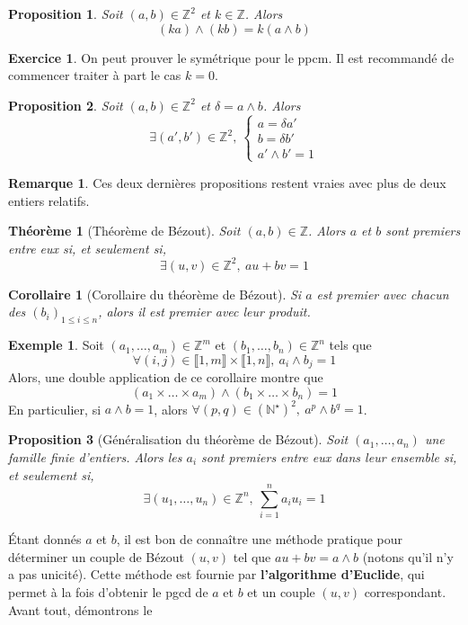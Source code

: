 \documentclass[french]{book}
\newcommand{\N}{\mathbb{N}}
\newcommand{\Z}{\mathbb{Z}}
\newcommand{\st}{^\star}
\theoremstyle{plain}
\newtheorem{thm}{Théorème}[chapter]
\newtheorem{prop}{Proposition}[chapter]
\newtheorem{cor}{Corollaire}[chapter]
\theoremstyle{definition}
\newtheorem{exa}{Exemple}[chapter]
\newtheorem{rmq}{Remarque}[chapter]
\newtheorem{exe}{Exercice}[chapter]
\theoremstyle{remark}
\begin{document}
\begin{prop}
	Soit $(a,b)\in\Z^2$ et $k\in\Z$. Alors $$(ka)\wedge(kb)=k(a\wedge b)$$
\end{prop}
\begin{exe}
	On peut prouver le symétrique pour le ppcm. Il est recommandé de commencer traiter à part le cas $k=0$.
\end{exe}
\begin{prop}
	Soit $(a,b)\in\Z^2$ et $\delta=a\wedge b$. Alors $$\exists(a',b')\in\Z^2,\ \left \{ \begin{array}{lll}a=\delta a' \\ b=\delta b' \\ a'\wedge b'=1\end{array}\right.$$
\end{prop}
\begin{rmq}
	Ces deux dernières propositions restent vraies avec plus de deux entiers relatifs.
\end{rmq}
\begin{thm}[Théorème de Bézout]
	Soit $(a,b)\in\Z$. Alors $a$ et $b$ sont premiers entre eux si, et seulement si, $$\exists(u,v)\in\Z^2,\ au+bv=1$$
\end{thm}
\begin{cor}[Corollaire du théorème de Bézout]
	Si $a$ est premier avec chacun des $(b_i)_{1\leqslant i\leqslant n}$, alors il est premier avec leur produit.
\end{cor}
\begin{exa}
	Soit $(a_1,\ldots,a_m)\in\Z^m$ et $(b_1,\ldots,b_n)\in\Z^n$ tels que $$\forall(i,j)\in\llbracket1,m\rrbracket\times\llbracket1,n\rrbracket,\ a_i\wedge b_j=1$$ Alors, une double application de ce corollaire montre que $$(a_1\times\ldots\times a_m)\wedge(b_1\times\ldots\times b_n)=1$$ En particulier, si $a\wedge b=1$, alors $\forall(p,q)\in(\N\st)^2,\ a^p\wedge b^q=1$.
\end{exa}
\begin{prop}[Généralisation du théorème de Bézout]
	Soit $(a_1,\ldots,a_n)$ une famille finie d'entiers. Alors les $a_i$ sont premiers entre eux dans leur ensemble si, et seulement si, $$\exists(u_1,\ldots,u_n)\in\Z^n,\ \sum_{i=1}^{n}a_iu_i=1$$
\end{prop}
Étant donnés $a$ et $b$, il est bon de connaître une méthode pratique pour déterminer un couple de Bézout $(u,v)$ tel que $au+bv=a\wedge b$ (notons qu'il n'y a pas unicité). Cette méthode est fournie par \textbf{l'algorithme d'Euclide}, qui permet à la fois d'obtenir le pgcd de $a$ et $b$ et un couple $(u,v)$ correspondant. Avant tout, démontrons le
\end{document}
